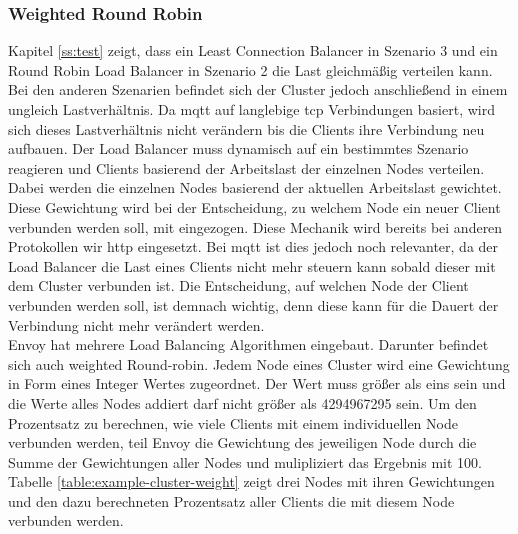 \subsubsection{Weighted Round Robin} \label{ss:weighted-rr}
Kapitel \ref{ss:test} zeigt, dass ein Least Connection Balancer in Szenario 3 und ein Round Robin Load Balancer in Szenario 2 die Last gleichmä{\ss}ig verteilen kann. Bei den anderen Szenarien befindet sich der Cluster jedoch anschlie{\ss}end in einem ungleich Lastverhältnis. Da \ac{mqtt} auf langlebige \ac{tcp} Verbindungen basiert, wird sich dieses Lastverhältnis nicht verändern bis die Clients ihre Verbindung neu aufbauen.
Der Load Balancer muss dynamisch auf ein bestimmtes Szenario reagieren und Clients basierend der Arbeitslast der einzelnen Nodes verteilen.
Dabei werden die einzelnen Nodes basierend der aktuellen Arbeitslast gewichtet. Diese Gewichtung wird bei der Entscheidung, zu welchem Node ein neuer Client verbunden werden soll, mit eingezogen.
Diese Mechanik wird bereits bei anderen Protokollen wir \ac{http} eingesetzt. Bei \ac{mqtt} ist dies jedoch noch relevanter, da der Load Balancer die Last eines Clients nicht mehr steuern kann sobald dieser mit dem Cluster verbunden ist. Die Entscheidung, auf welchen Node der Client verbunden werden soll, ist demnach wichtig, denn diese kann für die Dauert der Verbindung nicht mehr verändert werden.
\\
Envoy hat mehrere Load Balancing Algorithmen eingebaut. Darunter befindet sich auch weighted Round-robin. Jedem Node eines Cluster wird eine Gewichtung in Form eines Integer Wertes zugeordnet. Der Wert muss grö{\ss}er als eins sein und die Werte alles Nodes addiert darf nicht grö{\ss}er als 4294967295 sein.
Um den Prozentsatz zu berechnen, wie viele Clients mit einem individuellen Node verbunden werden, teil Envoy die Gewichtung des jeweiligen Node durch die Summe der Gewichtungen aller Nodes und mulipliziert das Ergebnis mit 100.
\cite{SupportedLoadBalancers}
\\
Tabelle \ref{table:example-cluster-weight} zeigt drei Nodes mit ihren Gewichtungen und den dazu berechneten Prozentsatz aller Clients die mit diesem Node verbunden werden.

